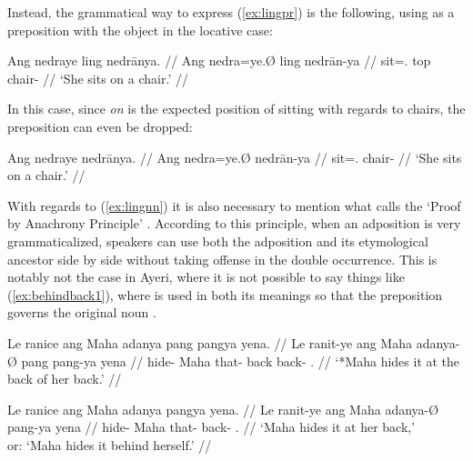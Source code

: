 \xe


\noindent Instead, the grammatical way to express (\ref{ex:lingpr}) is the 
following, using  as a preposition with the object in the 
locative case:

\ex\begingl
	\gla Ang nedraye ling nedrānya. //
	\glb Ang nedra=ye.Ø ling nedrān-ya //
	\glc \AgtT{} sit=\TsgF{}.\Top{} top chair-\Loc{} //
	\glft `She sits on a chair.' //
\endgl\xe

In this case, since \emph{on} is the expected position of sitting with regards 
to chairs, the preposition can even be dropped:

\ex\begingl
	\gla Ang nedraye nedrānya. //
	\glb Ang nedra=ye.Ø nedrān-ya //
	\glc \AgtT{} sit=\TsgF{}.\Top{} chair-\Loc{} //
	\glft `She sits on a chair.' //
\endgl\xe

With regards to (\ref{ex:lingnn}) it is also necessary to mention what 
\citeauthor{hagege2010} calls the `Proof by Anachrony Principle' 
\citep[158--159]{hagege2010}. According to this principle, when an adposition 
is very grammaticalized, speakers can use both the adposition and its 
etymological ancestor side by side without taking offense in the double 
occurrence. This is notably not the case in Ayeri, where it is not possible to 
say things like (\ref{ex:behindback1}), where  is used in both 
its meanings so that the preposition  governs the 
original noun .

\pex
\a\label{ex:behindback1}\ljudge* \begingl
	\gla Le ranice ang Maha adanya pang pangya yena. //
	\glb Le ranit-ye ang Maha adanya-Ø pang pang-ya yena //
	\glc \PatTI{} hide-\TsgF{} \Aarg{} Maha that-\Top{} back back-\Loc{} 
		\TsgF{}.\Gen{} //
	\glft `*Maha hides it at the back of her back.' //
\endgl

\a\label{ex:behindback2}\begingl
	\gla Le ranice ang Maha adanya pangya yena. //
	\glb Le ranit-ye ang Maha adanya-Ø pang-ya yena //
	\glc \PatTI{} hide-\TsgF{} \Aarg{} Maha that-\Top{} back-\Loc{} 
		\TsgF{}.\Gen{} //
	\glft `Maha hides it at her back,'\\
		or: `Maha hides it behind herself.' //
\endgl

\xe

